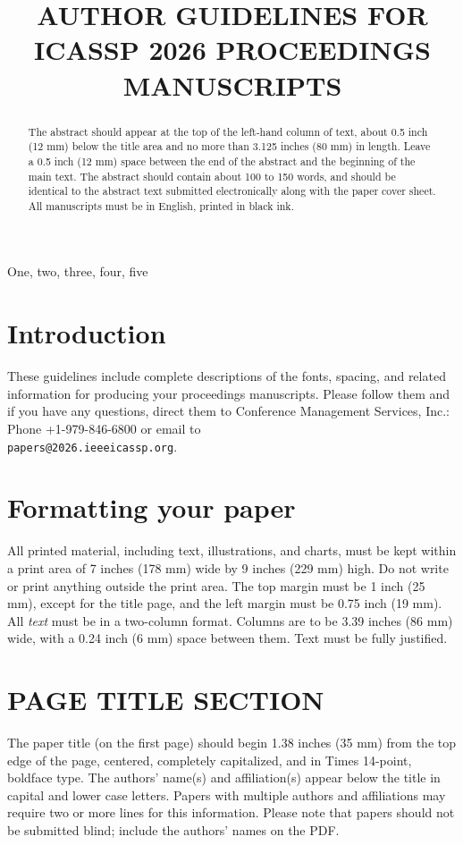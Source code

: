 \documentclass{article}
\title{AUTHOR GUIDELINES FOR ICASSP 2026 PROCEEDINGS MANUSCRIPTS}
\begin{document}
%
\maketitle
%
\begin{abstract}
The abstract should appear at the top of the left-hand column of text, about
0.5 inch (12 mm) below the title area and no more than 3.125 inches (80 mm) in
length.  Leave a 0.5 inch (12 mm) space between the end of the abstract and the
beginning of the main text.  The abstract should contain about 100 to 150
words, and should be identical to the abstract text submitted electronically
along with the paper cover sheet.  All manuscripts must be in English, printed
in black ink.
\end{abstract}
%
\begin{keywords}
One, two, three, four, five
\end{keywords}
%
\section{Introduction}
\label{sec:intro}

These guidelines include complete descriptions of the fonts, spacing, and
related information for producing your proceedings manuscripts. Please follow
them and if you have any questions, direct them to Conference Management
Services, Inc.: Phone +1-979-846-6800 or email
to \\\texttt{papers@2026.ieeeicassp.org}.

\section{Formatting your paper}
\label{sec:format}

All printed material, including text, illustrations, and charts, must be kept
within a print area of 7 inches (178 mm) wide by 9 inches (229 mm) high. Do
not write or print anything outside the print area. The top margin must be 1
inch (25 mm), except for the title page, and the left margin must be 0.75 inch
(19 mm).  All {\it text} must be in a two-column format. Columns are to be 3.39
inches (86 mm) wide, with a 0.24 inch (6 mm) space between them. Text must be
fully justified.

\section{PAGE TITLE SECTION}
\label{sec:pagestyle}

The paper title (on the first page) should begin 1.38 inches (35 mm) from the
top edge of the page, centered, completely capitalized, and in Times 14-point,
boldface type.  The authors' name(s) and affiliation(s) appear below the title
in capital and lower case letters.  Papers with multiple authors and
affiliations may require two or more lines for this information. Please note
that papers should not be submitted blind; include the authors' names on the
PDF.
\end{document}
